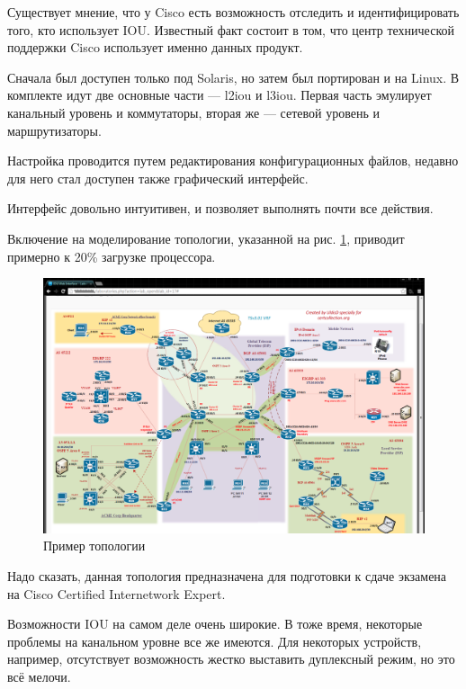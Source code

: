\documentclass[a4paper,14pt]{extreport}
\begin{document}
	Существует мнение, что у Cisco есть возможность отследить и идентифицировать того, кто использует IOU.
	Известный факт состоит в том, что центр технической поддержки Cisco использует именно данных продукт.
	
	Сначала  был доступен только под Solaris, но затем был портирован и
	на Linux. В комплекте идут две основные части --- l2iou и l3iou. Первая часть эмулирует канальный уровень и коммутаторы, вторая же — сетевой уровень и маршрутизаторы.
	
	Настройка проводится путем редактирования конфигурационных файлов, недавно для него стал доступен также графический интерфейс.
	
	Интерфейс довольно интуитивен, и позволяет выполнять почти все действия.
	
	Включение на моделирование топологии, указанной на рис. \ref{fig:topologyCCIE}, приводит примерно к 20\%
	загрузке процессора.
	
	\begin{figure}[h!]
		\centering
		\includegraphics[width=0.7\linewidth]{pic/topologyCCIE}
		\caption{Пример топологии}
		\label{fig:topologyCCIE}
	\end{figure}
	
	Надо сказать, данная топология предназначена для подготовки к сдаче экзамена на Cisco Certified Internetwork Expert.
	
	Возможности IOU на самом деле очень широкие. В тоже время, некоторые проблемы на канальном уровне все же имеются. Для некоторых устройств, например, отсутствует возможность жестко выставить дуплексный режим, но это всё мелочи.
	
\end{document}
